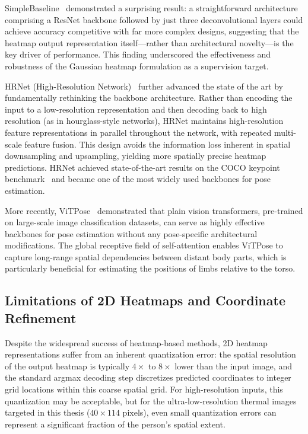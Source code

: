 SimpleBaseline~\cite{xiao2018simple} demonstrated a surprising result: a straightforward architecture comprising a ResNet backbone followed by just three deconvolutional layers could achieve accuracy competitive with far more complex designs, suggesting that the heatmap output representation itself---rather than architectural novelty---is the key driver of performance. This finding underscored the effectiveness and robustness of the Gaussian heatmap formulation as a supervision target.

HRNet (High-Resolution Network)~\cite{sun2019hrnet} further advanced the state of the art by fundamentally rethinking the backbone architecture. Rather than encoding the input to a low-resolution representation and then decoding back to high resolution (as in hourglass-style networks), HRNet maintains high-resolution feature representations in parallel throughout the network, with repeated multi-scale feature fusion. This design avoids the information loss inherent in spatial downsampling and upsampling, yielding more spatially precise heatmap predictions. HRNet achieved state-of-the-art results on the COCO keypoint benchmark~\cite{lin2014microsoft} and became one of the most widely used backbones for pose estimation.

More recently, ViTPose~\cite{xu2022vitpose} demonstrated that plain vision transformers, pre-trained on large-scale image classification datasets, can serve as highly effective backbones for pose estimation without any pose-specific architectural modifications. The global receptive field of self-attention enables ViTPose to capture long-range spatial dependencies between distant body parts, which is particularly beneficial for estimating the positions of limbs relative to the torso.

\subsection*{Limitations of 2D Heatmaps and Coordinate Refinement}

Despite the widespread success of heatmap-based methods, 2D heatmap representations suffer from an inherent quantization error: the spatial resolution of the output heatmap is typically $4\times$ to $8\times$ lower than the input image, and the standard argmax decoding step discretizes predicted coordinates to integer grid locations within this coarse spatial grid. For high-resolution inputs, this quantization may be acceptable, but for the ultra-low-resolution thermal images targeted in this thesis ($40 \times 114$ pixels), even small quantization errors can represent a significant fraction of the person's spatial extent.

